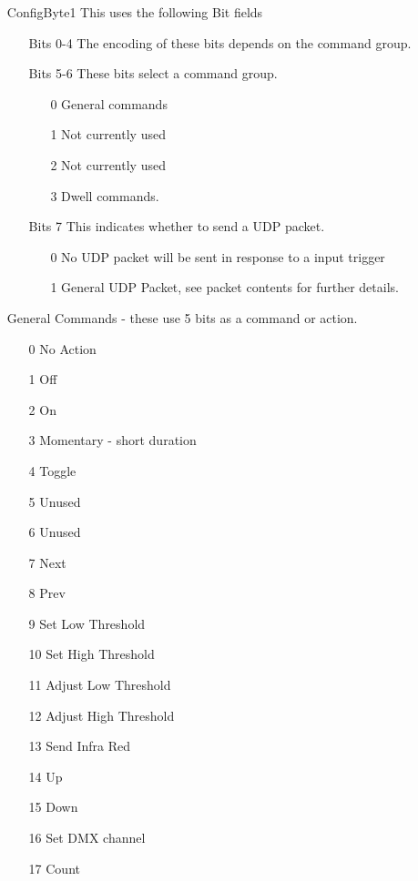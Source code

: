     \begin{enumerate}
    \item[ConfigByte1]
    This uses the following Bit fields
        \begin{enumerate}
        \item[Bits 0-4] The encoding of these bits depends on the command group.
        \item[Bits 5-6] These bits select a command group.
            \begin{enumerate}
            \item[0] General commands
            \item[1] Not currently used
            \item[2] Not currently used
            \item[3] Dwell commands.
            \end{enumerate}
        \item[Bits 7] This indicates whether to send a UDP packet.
            \begin{enumerate}
            \item[0] No UDP packet will be sent in response to a input trigger
            \item[1] General UDP Packet, see packet contents for further details.
            \end{enumerate}
        \end{enumerate}

        General Commands - these use 5 bits as a command or action.
            \begin{enumerate}
            \item[0] No Action
            \item[1] Off
            \item[2] On
            \item[3] Momentary - short duration
            \item[4] Toggle
            \item[5] Unused
            \item[6] Unused
            \item[7] Next
            \item[8] Prev
            \item[9] Set Low Threshold
            \item[10] Set High Threshold
            \item[11] Adjust Low Threshold
            \item[12] Adjust High Threshold
            \item[13] Send Infra Red
            \item[14] Up
            \item[15] Down
            \item[16] Set DMX channel
            \item[17] Count
            \end{enumerate}


\end{enumerate}
